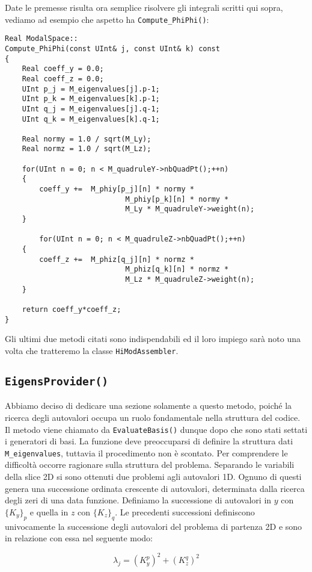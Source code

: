 Date le premesse risulta ora semplice risolvere gli integrali scritti qui sopra, vediamo ad esempio che aspetto ha \texttt{Compute\_PhiPhi()}:


\begin{lstlisting}[style = general]
Real ModalSpace::
Compute_PhiPhi(const UInt& j, const UInt& k) const
{
	Real coeff_y = 0.0;
	Real coeff_z = 0.0;
	UInt p_j = M_eigenvalues[j].p-1;
	UInt p_k = M_eigenvalues[k].p-1;
	UInt q_j = M_eigenvalues[j].q-1;
	UInt q_k = M_eigenvalues[k].q-1;
	
	Real normy = 1.0 / sqrt(M_Ly);
	Real normz = 1.0 / sqrt(M_Lz);
	
	for(UInt n = 0; n < M_quadruleY->nbQuadPt();++n)
	{
		coeff_y +=	M_phiy[p_j][n] * normy *	
							M_phiy[p_k][n] * normy *
							M_Ly * M_quadruleY->weight(n);
	}
	
		for(UInt n = 0; n < M_quadruleZ->nbQuadPt();++n)
	{
		coeff_z +=	M_phiz[q_j][n] * normz *	
							M_phiz[q_k][n] * normz *
							M_Lz * M_quadruleZ->weight(n);
	}
	
	return coeff_y*coeff_z;
}
\end{lstlisting}
 
 Gli ultimi due metodi citati sono indispendabili ed il loro impiego sar\`a noto una volta che tratteremo la classe \texttt{HiModAssembler}.
 
 \subsection{\texttt{EigensProvider()}}
 Abbiamo deciso di dedicare una sezione solamente a questo metodo, poich\'e la ricerca degli autovalori occupa un ruolo fondamentale nella struttura del codice.
 Il metodo viene chiamato da \texttt{EvaluateBasis()} dunque dopo che sono stati settati i generatori di basi. La funzione deve preoccuparsi di definire la struttura dati \texttt{M\_eigenvalues}, tuttavia il procedimento non \`e scontato. 
 Per comprendere le difficolt\`a occorre ragionare sulla struttura del problema. Separando le variabili della slice 2D si sono ottenuti due problemi agli autovalori 1D. Ognuno di questi genera una successione ordinata crescente di autovalori, determinata dalla ricerca degli zeri di una data funzione. Definiamo la successione di autovalori in $y$ con $\{K_y\}_p$ e quella in $z$ con $\{K_z\}_q$. Le precedenti successioni definiscono univocamente la successione degli autovalori del problema di partenza 2D e sono in relazione con essa nel seguente modo:

\begin{equation}
\label{eq: autovalori}
 \lambda_j = (K_y^p)^2 + (K_z^q)^2
\end{equation} 

